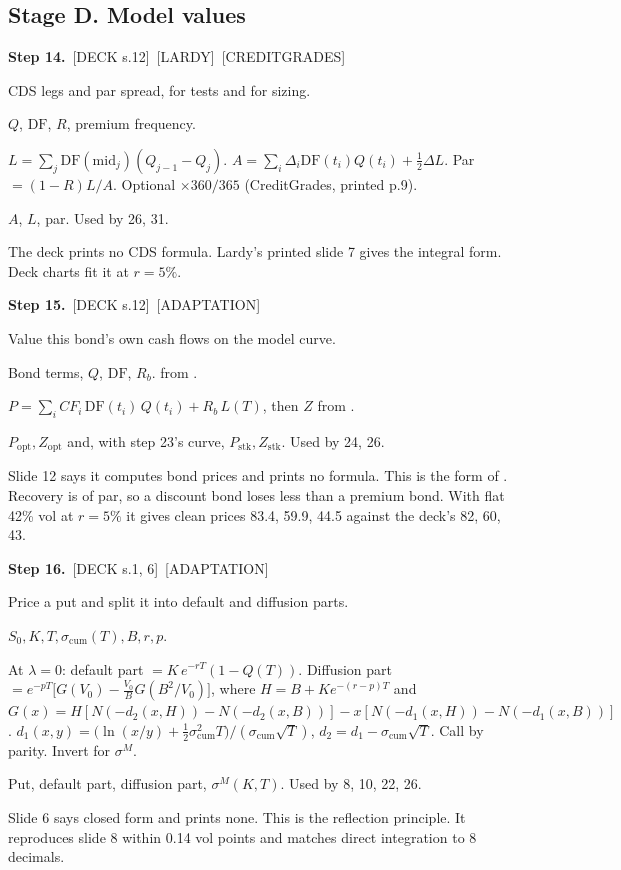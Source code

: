 \documentclass[10pt,a4paper]{article}
\newcommand{\DECK}[1]{\textsf{\footnotesize\textcolor{tagdeck}{[DECK s.#1]}}}
\newcommand{\CG}{\textsf{\footnotesize\textcolor{tagother}{[CREDITGRADES]}}}
\newcommand{\LARDY}{\textsf{\footnotesize\textcolor{tagother}{[LARDY]}}}
\newcommand{\ADAPT}{\textsf{\footnotesize\textcolor{tagadapt}{[ADAPTATION]}}}
\newenvironment{step}[3]{%
  \par\needspace{5\baselineskip}\medskip\noindent\textbf{Step #1.}\ \fn{#2}\hfill#3\par\nopagebreak\small
  \begin{description}[style=sameline,leftmargin=1.7cm,labelwidth=1.5cm,labelsep=0.2cm,itemsep=1pt,parsep=0pt,topsep=1pt,font=\small\bfseries]
}{\end{description}\normalsize}
\newcommand{\scum}{\sigma_{\mathrm{cum}}}
\newcommand{\Zo}{Z_{\mathrm{opt}}}
\newcommand{\Zs}{Z_{\mathrm{stk}}}
\newcommand{\DF}{\mathrm{DF}}
\begin{document}
\subsection*{Stage D. Model values}

\begin{step}{14}{fk_cds}{\DECK{12}\ \LARDY\ \CG}
\item[Purpose] CDS legs and par spread, for tests and for sizing.
\item[Inputs] $Q$, $\DF$, $R$, premium frequency.
\item[Formula] $L=\sum_j\DF(\text{mid}_j)(Q_{j-1}-Q_j)$. $A=\sum_i\Delta_i\DF(t_i)Q(t_i)+\tfrac12\Delta L$. Par $=(1-R)L/A$. Optional $\times360/365$ (CreditGrades, printed p.9).
\item[Outputs] $A$, $L$, par. Used by 26, 31.
\item[Why] The deck prints no CDS formula. Lardy's printed slide 7 gives the integral form. Deck charts fit it at $r=5\%$.
\end{step}

\begin{step}{15}{fk_bond_price}{\DECK{12}\ \ADAPT}
\item[Purpose] Value this bond's own cash flows on the model curve.
\item[Inputs] Bond terms, $Q$, $\DF$, $R_b$.  from .
\item[Formula] $P=\sum_i CF_i\,\DF(t_i)\,Q(t_i)+R_b\,L(T)$, then $Z$ from .
\item[Outputs] $P_{\text{opt}},\Zo$ and, with step 23's curve, $P_{\text{stk}},\Zs$. Used by 24, 26.
\item[Why] Slide 12 says it computes bond prices and prints no formula. This is the form of . Recovery is of par, so a discount bond loses less than a premium bond. With flat 42\% vol at $r=5\%$ it gives clean prices 83.4, 59.9, 44.5 against the deck's 82, 60, 43.
\end{step}

\begin{step}{16}{fk_put}{\DECK{1, 6}\ \ADAPT}
\item[Purpose] Price a put and split it into default and diffusion parts.
\item[Inputs] $S_0,K,T,\scum(T),B,r,p$.
\item[Formula] At $\lambda=0$: default part $=K\,e^{-rT}(1-Q(T))$. Diffusion part $=e^{-pT}\big[G(V_0)-\tfrac{V_0}{B}G(B^2/V_0)\big]$, where $H=B+Ke^{-(r-p)T}$ and $G(x)=H[N(-d_2(x,H))-N(-d_2(x,B))]-x[N(-d_1(x,H))-N(-d_1(x,B))]$. $d_1(x,y)=\big(\ln(x/y)+\tfrac12\scum^2T\big)/(\scum\sqrt T)$, $d_2=d_1-\scum\sqrt T$. Call by parity. Invert for $\sigma^M$.
\item[Outputs] Put, default part, diffusion part, $\sigma^M(K,T)$. Used by 8, 10, 22, 26.
\item[Why] Slide 6 says closed form and prints none. This is the reflection principle. It reproduces slide 8 within 0.14 vol points and matches direct integration to 8 decimals.
\end{step}
\end{document}
